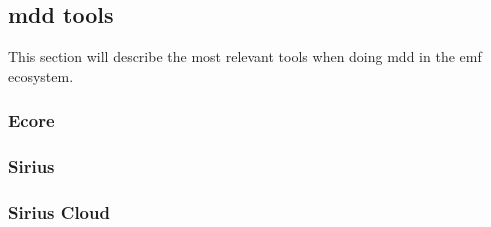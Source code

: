 \subsection{\acrshort{mdd} tools}

This section will describe the most relevant tools when doing \acrfull{mdd} in the \acrlong{emf} ecosystem.

\subsubsection*{Ecore}

\subsubsection*{Sirius}

\subsubsection*{Sirius Cloud}

